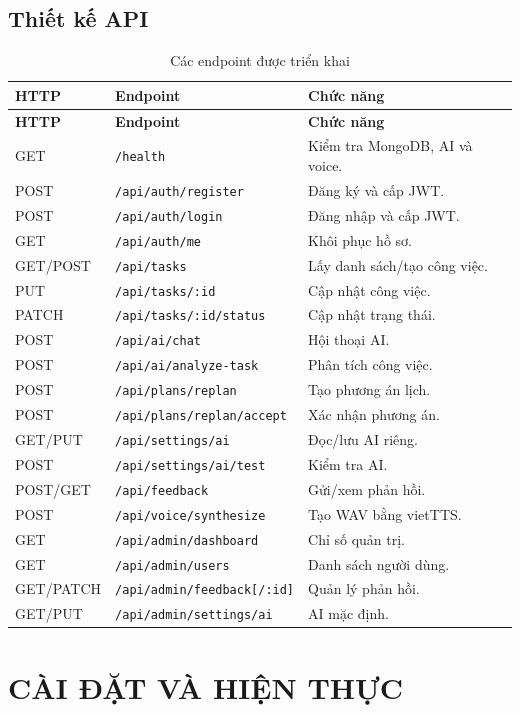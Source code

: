 \documentclass[12pt,a4paper,oneside]{report}
\begin{document}
\section{Thiết kế API}
\small
\begin{longtable}{p{1.5cm}p{5.2cm}p{7.4cm}}
\caption{Các endpoint được triển khai}\label{tab:api}\\
\toprule\textbf{HTTP}&\textbf{Endpoint}&\textbf{Chức năng}\\\midrule\endfirsthead
\toprule\textbf{HTTP}&\textbf{Endpoint}&\textbf{Chức năng}\\\midrule\endhead
GET&\texttt{/health}&Kiểm tra MongoDB, AI và voice.\\
POST&\texttt{/api/auth/register}&Đăng ký và cấp JWT.\\
POST&\texttt{/api/auth/login}&Đăng nhập và cấp JWT.\\
GET&\texttt{/api/auth/me}&Khôi phục hồ sơ.\\
GET/POST&\texttt{/api/tasks}&Lấy danh sách/tạo công việc.\\
PUT&\texttt{/api/tasks/:id}&Cập nhật công việc.\\
PATCH&\texttt{/api/tasks/:id/status}&Cập nhật trạng thái.\\
POST&\texttt{/api/ai/chat}&Hội thoại AI.\\
POST&\texttt{/api/ai/analyze-task}&Phân tích công việc.\\
POST&\texttt{/api/plans/replan}&Tạo phương án lịch.\\
POST&\texttt{/api/plans/replan/accept}&Xác nhận phương án.\\
GET/PUT&\texttt{/api/settings/ai}&Đọc/lưu AI riêng.\\
POST&\texttt{/api/settings/ai/test}&Kiểm tra AI.\\
POST/GET&\texttt{/api/feedback}&Gửi/xem phản hồi.\\
POST&\texttt{/api/voice/synthesize}&Tạo WAV bằng vietTTS.\\
GET&\texttt{/api/admin/dashboard}&Chỉ số quản trị.\\
GET&\texttt{/api/admin/users}&Danh sách người dùng.\\
GET/PATCH&\texttt{/api/admin/feedback[/:id]}&Quản lý phản hồi.\\
GET/PUT&\texttt{/api/admin/settings/ai}&AI mặc định.\\\bottomrule
\end{longtable}\normalsize

\chapter{CÀI ĐẶT VÀ HIỆN THỰC}
\end{document}
